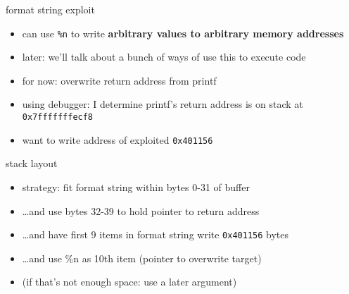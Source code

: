 \usetikzlibrary{matrix}
\begin{frame}{format string exploit}
    \begin{itemize}
    \item can use \texttt{\%n} to write \textbf{arbitrary values to arbitrary memory addresses}
    \item later: we'll talk about a bunch of ways of use this to execute code
    \item for now: overwrite return address from printf
    \vspace{.5cm}
    \item using debugger: I determine printf's return address is on stack at \texttt{0x7fffffffecf8}
    \item want to write address of exploited \texttt{0x401156}
    \end{itemize}
\end{frame}

\begin{frame}[fragile,label=exploitPatternSimple]{stack layout}
\begin{itemize}
\item<2-> strategy: fit format string within bytes 0-31 of buffer
\item<2-> \ldots and use bytes 32-39 to hold pointer to return address
\item<2-> \ldots and have first 9 items in format string write \texttt{0x401156} bytes
\item<2-> \ldots and use \%n as 10th item (pointer to overwrite target)
\vspace{.5cm}
\item<3-> (if that's not enough space: use a later argument)
\end{itemize}
\end{frame}

